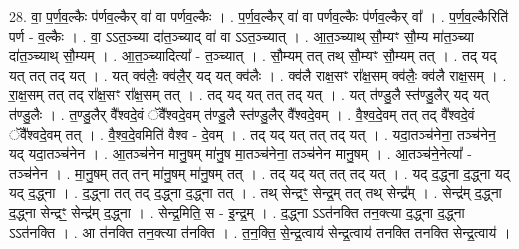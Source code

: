 \documentclass[17pt]{extarticle}
\begin{document}
28. वा॒ प॒र्ण॒व॒ल्कैः प॑र्णव॒ल्कैर् वा॑ वा पर्णव॒ल्कैः । . प॒र्ण॒व॒ल्कैर् वा॑ वा पर्णव॒ल्कैः प॑र्णव॒ल्कैर् वा᳚ । . प॒र्ण॒व॒ल्कैरिति॑ पर्ण - व॒ल्कैः । . वा॒ ऽऽत॒ञ्च्या दा॑त॒ञ्च्याद् वा॑ वा ऽऽत॒ञ्च्यात् । . आ॒त॒ञ्च्याथ् सौ॒म्यꣳ सौ॒म्य मा॑त॒ञ्च्या दा॑त॒ञ्च्याथ् सौ॒म्यम् । . आ॒त॒ञ्च्यादित्या᳚ - त॒ञ्च्यात् । . सौ॒म्यम् तत् तथ् सौ॒म्यꣳ सौ॒म्यम् तत् । . तद् यद् यत् तत् तद् यत् । . यत् क्व॑लैः॒ क्व॑लै॒र् यद् यत् क्व॑लैः । . क्व॑लै राक्ष॒सꣳ रा᳚क्ष॒सम् क्व॑लैः॒ क्व॑लै राक्ष॒सम् । . रा॒क्ष॒सम् तत् तद् रा᳚क्ष॒सꣳ रा᳚क्ष॒सम् तत् । . तद् यद् यत् तत् तद् यत् । . यत् त॑ण्डु॒लै स्त॑ण्डु॒लैर् यद् यत् त॑ण्डु॒लैः । . त॒ण्डु॒लैर् वै᳚श्वदे॒वं ॅवै᳚श्वदे॒वम् त॑ण्डु॒लै स्त॑ण्डु॒लैर् वै᳚श्वदे॒वम् । . वै॒श्व॒दे॒वम् तत् तद् वै᳚श्वदे॒वं ॅवै᳚श्वदे॒वम् तत् । . वै॒श्व॒दे॒वमिति॑ वैश्व - दे॒वम् । . तद् यद् यत् तत् तद् यत् । . यदा॒तञ्च॑नेना॒ तञ्च॑नेन॒ यद् यदा॒तञ्च॑नेन । . आ॒तञ्च॑नेन मानु॒षम् मा॑नु॒ष मा॒तञ्च॑नेना॒ तञ्च॑नेन मानु॒षम् । . आ॒तञ्च॑ने॒नेत्या᳚ - तञ्च॑नेन । . मा॒नु॒षम् तत् तन् मा॑नु॒षम् मा॑नु॒षम् तत् । . तद् यद् यत् तत् तद् यत् । . यद् द॒द्ध्ना द॒द्ध्ना यद् यद् द॒द्ध्ना । . द॒द्ध्ना तत् तद् द॒द्ध्ना द॒द्ध्ना तत् । . तथ् सेन्द्रꣳ॒॒ सेन्द्र॒म् तत् तथ् सेन्द्र᳚म् । . सेन्द्र॑म् द॒द्ध्ना द॒द्ध्ना सेन्द्रꣳ॒॒ सेन्द्र॑म् द॒द्ध्ना । . सेन्द्र॒मिति॒ स - इ॒न्द्र॒म् । . द॒द्ध्ना ऽऽत॑नक्ति तन॒क्त्या द॒द्ध्ना द॒द्ध्ना ऽऽत॑नक्ति । . आ त॑नक्ति तन॒क्त्या त॑नक्ति । . त॒न॒क्ति॒ से॒न्द्र॒त्वाय॑ सेन्द्र॒त्वाय॑ तनक्ति तनक्ति सेन्द्र॒त्वाय॑ । \newline
\end{document}
